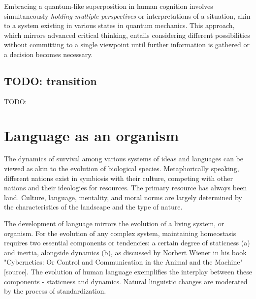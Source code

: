 \documentclass[11pt,a4]{article}
\begin{document}
        Embracing a quantum-like superposition in human cognition involves simultaneously \textit{holding multiple perspectives} or interpretations of a situation, akin to a system existing in various states in quantum mechanics. This approach, which mirrors advanced critical thinking, entails considering different possibilities without committing to a single viewpoint until further information is gathered or a decision becomes necessary.

\subsection{TODO: transition}
TODO:

\section{Language as an organism}
    The dynamics of survival among various systems of ideas and languages can be viewed as akin to the evolution of biological species. Metaphorically speaking, different nations exist in symbiosis with their culture, competing with other nations and their ideologies for resources.
    The primary resource has always been land. Culture, language, mentality, and moral norms are largely determined by the characteristics of the landscape and the type of nature.

    \par
    The development of language mirrors the evolution of a living system, or organism. For the evolution of any complex system, maintaining homeostasis requires two essential components or tendencies: a certain degree of staticness (a) and inertia, alongside dynamics (b), as discussed by Norbert Wiener in his book "Cybernetics: Or Control and Communication in the Animal and the Machine" [source]. The evolution of human language exemplifies the interplay between these components - staticness and dynamics. Natural linguistic changes are moderated by the process of standardization.
\end{document}
